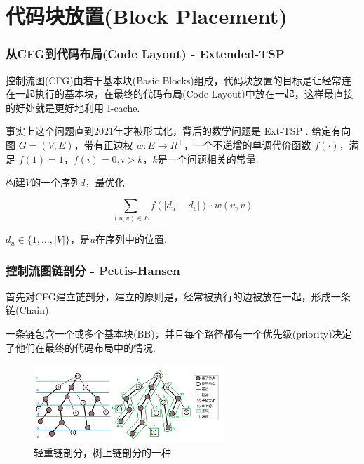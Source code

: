 \section{代码块放置(Block Placement)}

\begin{frame}
    \frametitle{从CFG到代码布局(Code Layout) - Extended-TSP}

    控制流图(CFG)由若干基本块(Basic Blocks)组成，代码块放置的目标是让经常连在一起执行的基本块，在最终的代码布局(Code Layout)中放在一起，这样最直接的好处就是更好地利用 I-cache.

    事实上这个问题直到2021年才被形式化，背后的数学问题是 Ext-TSP \cite{mestre2021extended}. 给定有向图 $G = (V, E)$，带有正边权 $w: E \rightarrow R^{+}$，一个不递增的单调代价函数 $f(\cdot)$，满足 $f(1) = 1$，$f(i) = 0, i > k$，$k$是一个问题相关的常量.

    构建$V$的一个序列$d$，最优化

    \begin{equation}
        \sum_{(u, v) \in E} f(\left\lvert d_u - d_v \right\rvert) \cdot w(u, v)
    \end{equation}

    $d_u \in \lbrace 1, \dots, \left\lvert V \right\rvert \rbrace$，是$u$在序列中的位置.
\end{frame}

\begin{frame}
    \frametitle{控制流图链剖分 - Pettis-Hansen}

    首先对CFG建立链剖分，建立的原则是，经常被执行的边被放在一起，形成一条链(Chain).

    一条链包含一个或多个基本块(BB)，并且每个路径都有一个优先级(priority)决定了他们在最终的代码布局中的情况.

    \begin{figure}
        \centering
        \includegraphics[width=0.64\textwidth]{images/hld.png}
        \caption{\cite{unknown-author-2022}轻重链剖分，树上链剖分的一种}
    \end{figure}

\end{frame}


